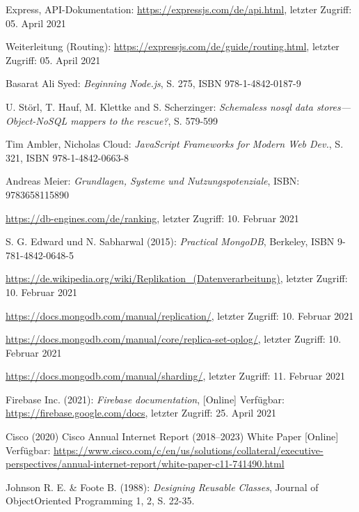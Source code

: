\documentclass[11pt,a4paper]{article}
\begin{document}
\begin{itemize}
 Express, API-Dokumentation: \url{https://expressjs.com/de/api.html}, letzter Zugriff: 05. April 2021

 Weiterleitung (Routing): \url{https://expressjs.com/de/guide/routing.html}, letzter Zugriff: 05. April 2021

 Basarat Ali Syed: \textit{Beginning Node.js}, S. 275, ISBN 978-1-4842-0187-9

 U. Störl, T. Hauf, M. Klettke and S. Scherzinger: \textit{Schemaless nosql data stores—Object-NoSQL mappers to the rescue?}, S. 579-599

 Tim Ambler, Nicholas Cloud: \textit{JavaScript Frameworks for Modern Web Dev.}, S. 321, ISBN 978-1-4842-0663-8


%
%
%
%

 Andreas Meier: \textit{Grundlagen, Systeme und Nutzungspotenziale}, ISBN: 9783658115890


 \url{https://db-engines.com/de/ranking}, letzter Zugriff: 10. Februar 2021

 S. G. Edward und N. Sabharwal (2015): \textit{Practical MongoDB}, Berkeley, ISBN 9-781-4842-0648-5

 \url{https://de.wikipedia.org/wiki/Replikation_(Datenverarbeitung)}, letzter Zugriff: 10. Februar 2021

 \url{https://docs.mongodb.com/manual/replication/}, letzter Zugriff: 10. Februar 2021

 \url{https://docs.mongodb.com/manual/core/replica-set-oplog/}, letzter Zugriff: 10. Februar 2021

 \url{https://docs.mongodb.com/manual/sharding/}, letzter Zugriff: 11. Februar 2021

 Firebase Inc. (2021): \textit{Firebase documentation}, [Online] Verfügbar: \url{https://firebase.google.com/docs}, letzter Zugriff: 25. April 2021

 Cisco (2020) Cisco Annual Internet Report (2018–2023) White Paper [Online] Verfügbar: \url{https://www.cisco.com/c/en/us/solutions/collateral/executive-perspectives/annual-internet-report/white-paper-c11-741490.html}

 Johnson R. E. \&  Foote B. (1988): \textit{Designing Reusable Classes}, Journal of ObjectOriented Programming 1, 2, S. 22-35.


\end{itemize}
\end{document}
